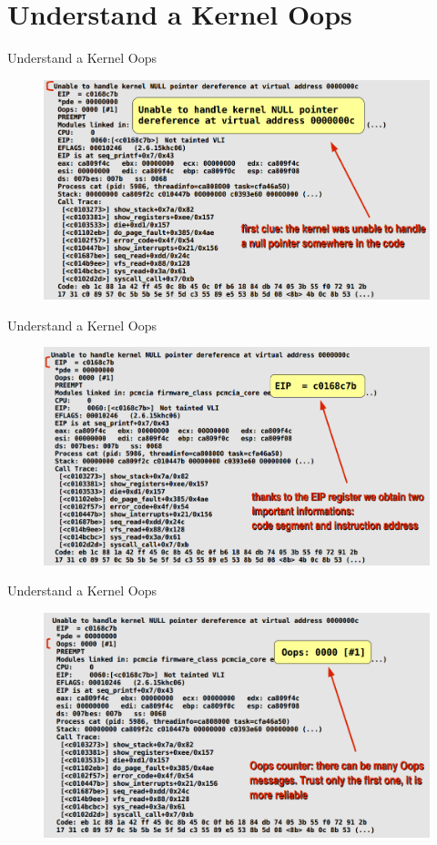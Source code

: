 \documentclass{workshop}
\begin{document}
\section{Understand a Kernel Oops}
\begin{frame}{Understand a Kernel Oops}
\begin{figure}
  \includegraphics[scale=0.3]{img/1.png}
  \end{figure}
\end{frame}

\begin{frame}{Understand a Kernel Oops}
\begin{figure}
  \includegraphics[scale=0.3]{img/2.png}
  \end{figure}
\end{frame}

\begin{frame}{Understand a Kernel Oops}
\begin{figure}
  \includegraphics[scale=0.3]{img/3.png}
  \end{figure}
\end{frame}
\end{document}
